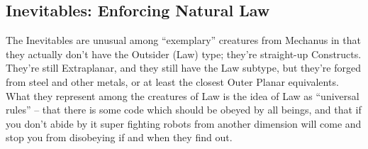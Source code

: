 \subsection{Inevitables: Enforcing Natural Law}

The Inevitables are unusual among ``exemplary'' creatures from Mechanus in that they actually don't have the Outsider (Law) type; they're straight-up Constructs. They're still Extraplanar, and they still have the Law subtype, but they're forged from steel and other metals, or at least the closest Outer Planar equivalents. What they represent among the creatures of Law is the idea of Law as ``universal rules'' -- that there is some code which should be obeyed by all beings, and that if you don't abide by it super fighting robots from another dimension will come and stop you from disobeying if and when they find out.